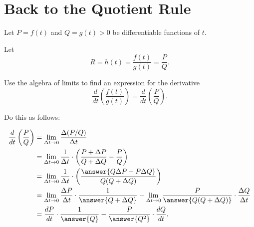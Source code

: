 \documentclass{ximera}
\begin{document}
\section{Back to the Quotient Rule}
\begin{question} \label{Qppf3r39c}
Let $P=f(t)$ and $Q=g(t)>0$ be differentiable functions of $t$.

Let 
\[
  R = h(t) = \frac{f(t)}{g(t)} = \frac{P}{Q}.
\]

Use the algebra of limits to find an expression for the derivative
\[
 \frac{d}{dt} \left( \frac{f(t)}{g(t)} \right) = \frac{d}{dt} \left( \frac{P}{Q} \right) .
\]

Do this as follows:

\begin{align*}
 \frac{d}{dt} \left( \frac{P}{Q} \right)   &= \lim_{\Delta t \to 0} \frac{\Delta (P/Q)}{\Delta t} \\
                                                        &= \lim_{\Delta t \to 0} \frac{1}{\Delta t} \cdot \left( \frac{P+\Delta P}{Q+\Delta Q} - \frac{P}{Q}   \right) \\
                                                       &= \lim_{\Delta t \to 0} \frac{1}{\Delta t} \cdot \left( \frac{\answer{Q\Delta P - P\Delta Q}}{Q(Q+\Delta Q)} \right) \\
                                                     &=\lim_{\Delta t \to 0} \frac{\Delta P}{\Delta t}\cdot \frac{1}{\answer{Q+\Delta Q}} - \lim_{\Delta t \to 0}\frac{P}{\answer{Q(Q+\Delta Q)}} \cdot \frac{\Delta Q}{\Delta t} \\
                                                     &= \frac{dP}{dt}\cdot \frac{1}{\answer{Q}} - \frac{P}{\answer{Q^2}}\cdot \frac{dQ}{dt} .
\end{align*}

\end{question}
\end{document}

